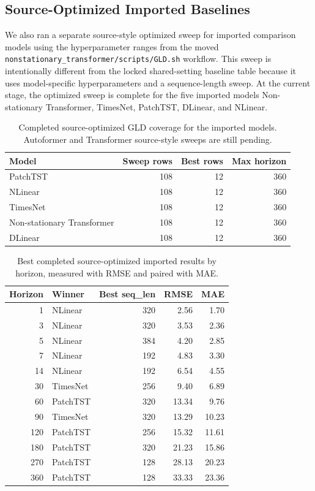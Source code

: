 \subsection{Source-Optimized Imported Baselines}

We also ran a separate source-style optimized sweep for imported comparison models using the hyperparameter ranges from the moved \texttt{nonstationary\_transformer/scripts/GLD.sh} workflow.
This sweep is intentionally different from the locked shared-setting baseline table because it uses model-specific hyperparameters and a sequence-length sweep.
At the current stage, the optimized sweep is complete for the five imported models Non-stationary Transformer, TimesNet, PatchTST, DLinear, and NLinear.

\begin{table}[t]
\centering
\caption{Completed source-optimized GLD coverage for the imported models. Autoformer and Transformer source-style sweeps are still pending.}
\label{tab:gld-source-optimized-partial}
\small
\begin{tabular}{lrrr}
\toprule
Model & Sweep rows & Best rows & Max horizon \\
\midrule
PatchTST & 108 & 12 & 360 \\
NLinear & 108 & 12 & 360 \\
TimesNet & 108 & 12 & 360 \\
Non-stationary Transformer & 108 & 12 & 360 \\
DLinear & 108 & 12 & 360 \\
\bottomrule
\end{tabular}
\end{table}

\begin{table}[t]
\centering
\caption{Best completed source-optimized imported results by horizon, measured with RMSE and paired with MAE.}
\label{tab:gld-source-optimized-best}
\small
\begin{tabular}{r l r r r}
\toprule
Horizon & Winner & Best seq\_len & RMSE & MAE \\
\midrule
1 & NLinear & 320 & 2.56 & 1.70 \\
3 & NLinear & 320 & 3.53 & 2.36 \\
5 & NLinear & 384 & 4.20 & 2.85 \\
7 & NLinear & 192 & 4.83 & 3.30 \\
14 & NLinear & 192 & 6.54 & 4.55 \\
30 & TimesNet & 256 & 9.40 & 6.89 \\
60 & PatchTST & 320 & 13.34 & 9.76 \\
90 & TimesNet & 320 & 13.29 & 10.23 \\
120 & PatchTST & 256 & 15.32 & 11.61 \\
180 & PatchTST & 320 & 21.23 & 15.86 \\
270 & PatchTST & 128 & 28.13 & 20.23 \\
360 & PatchTST & 128 & 33.33 & 23.36 \\
\bottomrule
\end{tabular}
\end{table}

